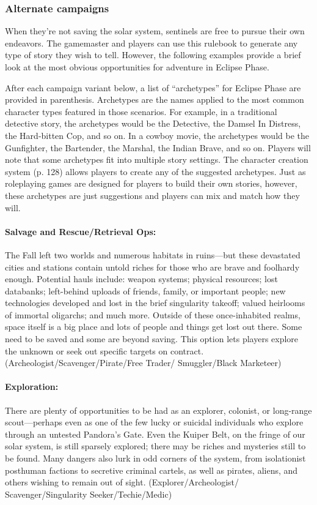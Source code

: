 \subsubsection{Alternate campaigns} \label{sec:alternate-campaigns} 

When they're not saving the solar system, sentinels are free to pursue their own endeavors. The gamemaster and players can use this rulebook to generate any type of story they wish to tell. However, the following examples provide a brief look at the most obvious opportunities for adventure in Eclipse Phase. 

After each campaign variant below, a list of ``archetypes'' for Eclipse Phase are provided in parenthesis. Archetypes are the names applied to the most common character types featured in those scenarios. For example, in a traditional detective story, the archetypes would be the Detective, the Damsel In Distress, the Hard-bitten Cop, and so on. In a cowboy movie, the archetypes would be the Gunfighter, the Bartender, the Marshal, the Indian Brave, and so on. Players will note that some archetypes fit into multiple story settings. The character creation system (p. 128) allows players to create any of the suggested archetypes. Just as roleplaying games are designed for players to build their own stories, however, these archetypes are just suggestions and players can mix and match how they will. 

\paragraph{Salvage and Rescue/Retrieval Ops:} The Fall left two worlds and numerous habitats in ruins—but these devastated cities and stations contain untold riches for those who are brave and foolhardy enough. Potential hauls include: weapon systems; physical resources; lost databanks; left-behind uploads of friends, family, or important people; new technologies developed and lost in the brief singularity takeoff; valued heirlooms of immortal oligarchs; and much more. Outside of these once-inhabited realms, space itself is a big place and lots of people and things get lost out there. Some need to be saved and some are beyond saving. This option lets players explore the unknown or seek out specific targets on contract. (Archeologist/Scavenger/Pirate/Free Trader/ Smuggler/Black Marketeer) 

\paragraph{Exploration:} There are plenty of opportunities to be had as an explorer, colonist, or long-range scout—perhaps even as one of the few lucky or suicidal individuals who explore through an untested Pandora's Gate. Even the Kuiper Belt, on the fringe of our solar system, is still sparsely explored; there may be riches and mysteries still to be found. Many dangers also lurk in odd corners of the system, from isolationist posthuman factions to secretive criminal cartels, as well as pirates, aliens, and others wishing to remain out of sight. (Explorer/Archeologist/ Scavenger/Singularity Seeker/Techie/Medic) 

